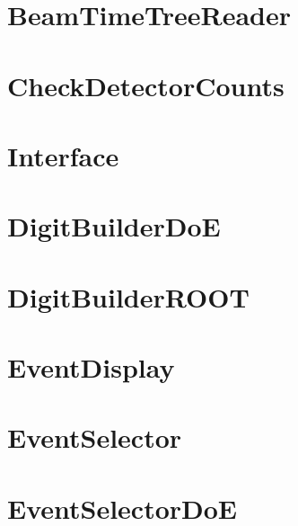 \documentclass[twoside]{book}
\begin{document}
\chapter{Beam\-Time\-Tree\-Reader}
\label{md_UserTools_BeamTimeTreeReader_README}
\hypertarget{md_UserTools_BeamTimeTreeReader_README}{}

\chapter{Check\-Detector\-Counts}
\label{md_UserTools_CheckDetectorCounts_README}
\hypertarget{md_UserTools_CheckDetectorCounts_README}{}

\chapter{Interface}
\label{md_UserTools_DigitBuilder_README}
\hypertarget{md_UserTools_DigitBuilder_README}{}

\chapter{Digit\-Builder\-Do\-E}
\label{md_UserTools_DigitBuilderDoE_README}
\hypertarget{md_UserTools_DigitBuilderDoE_README}{}

\chapter{Digit\-Builder\-R\-O\-O\-T}
\label{md_UserTools_DigitBuilderROOT_README}
\hypertarget{md_UserTools_DigitBuilderROOT_README}{}

\chapter{Event\-Display}
\label{md_UserTools_EventDisplay_README}
\hypertarget{md_UserTools_EventDisplay_README}{}

\chapter{Event\-Selector}
\label{md_UserTools_EventSelector_README}
\hypertarget{md_UserTools_EventSelector_README}{}

\chapter{Event\-Selector\-Do\-E}
\label{md_UserTools_EventSelectorDoE_README}
\hypertarget{md_UserTools_EventSelectorDoE_README}{}

\end{document}
